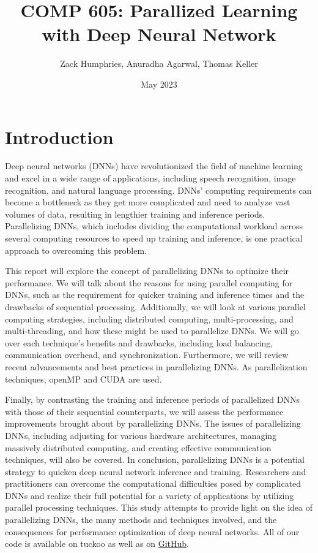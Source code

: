 \documentclass[11pt]{article}
\title{COMP 605: Parallized Learning with Deep Neural Network}
\author{Zack Humphries, Anuradha Agarwal, Thomas Keller}
\date{May 2023}
\begin{document}
\maketitle

\tableofcontents

\section{Introduction}
Deep neural networks (DNNs) have revolutionized the field of machine learning and excel in a wide range of applications, including speech recognition, image recognition, and natural language processing. DNNs' computing requirements can become a bottleneck as they get more complicated and need to analyze vast volumes of data, resulting in lengthier training and inference periods. Parallelizing DNNs, which includes dividing the computational workload across several computing resources to speed up training and inference, is one practical approach to overcoming this problem.

\bigskip

This report will explore the concept of parallelizing DNNs to optimize their performance. We will talk about the reasons for using parallel computing for DNNs, such as the requirement for quicker training and inference times and the drawbacks of sequential processing. Additionally, we will look at various parallel computing strategies, including distributed computing, multi-processing, and multi-threading, and how these might be used to parallelize DNNs. We will go over each technique's benefits and drawbacks, including load balancing, communication overhead, and synchronization. Furthermore, we will review recent advancements and best practices in parallelizing DNNs. As parallelization techniques, openMP and CUDA are used.


\bigskip

Finally, by contrasting the training and inference periods of parallelized DNNs with those of their sequential counterparts, we will assess the performance improvements brought about by parallelizing DNNs. The issues of parallelizing DNNs, including adjusting for various hardware architectures, managing massively distributed computing, and creating effective communication techniques, will also be covered. In conclusion, parallelizing DNNs is a potential strategy to quicken deep neural network inference and training. Researchers and practitioners can overcome the computational difficulties posed by complicated DNNs and realize their full potential for a variety of applications by utilizing parallel processing techniques. This study attempts to provide light on the idea of parallelizing DNNs, the many methods and techniques involved, and the consequences for performance optimization of deep neural networks. All of our code is available on tuckoo as well as on \href{https://github.com/thomkell/DeepNeuralNetwork}{GitHub}. 
\end{document}
